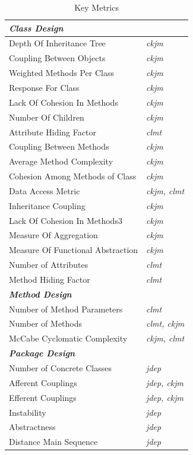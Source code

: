 \documentclass{sig-alternate}
\begin{document}
\begin{table}
\centering
\caption{Key Metrics}
\label{tbl:selected-metrics}
\begin{tabular}{l l}
 \hline
\multicolumn{2}{l}{\textit{\textbf{Class Design}}}\\
\hline
Depth Of Inheritance Tree & \textit{ckjm}\\
Coupling Between Objects & \textit{ckjm}\\
Weighted Methods Per Class & \textit{ckjm}\\
Response For Class & \textit{ckjm}\\
Lack Of Cohesion In Methods & \textit{ckjm}\\
Number Of Children & \textit{ckjm}\\
Attribute Hiding Factor & \textit{clmt}\\
Coupling Between Methods & \textit{ckjm}\\
Average Method Complexity & \textit{ckjm}\\
Cohesion Among Methods of Class & \textit{ckjm}\\
Data Access Metric & \textit{ckjm, clmt}\\
Inheritance Coupling & \textit{ckjm}\\
Lack Of Cohesion In Methods3 & \textit{ckjm}\\
Measure Of Aggregation & \textit{ckjm}\\
Measure Of Functional Abstraction & \textit{ckjm}\\
Number of Attributes & \textit{clmt}\\
Method Hiding Factor & \textit{clmt}\\
\hline
\multicolumn{2}{l}{\textit{\textbf{Method Design}}}\\
\hline
Number of Method Parameters & \textit{clmt}\\
Number of Methods & \textit{clmt, ckjm}\\
McCabe Cyclomatic Complexity & \textit{ckjm, clmt}\\
\hline
\multicolumn{2}{l}{\textit{\textbf{Package Design}}}\\
\hline
Number of Concrete Classes & \textit{jdep}\\
Afferent Couplings & \textit{jdep, ckjm}\\
Efferent Couplings & \textit{jdep, ckjm}\\
Instability & \textit{jdep}\\
Abstractness & \textit{jdep}\\
Distance Main Sequence & \textit{jdep}\\

\end{tabular}
\end{table}
\end{document}
